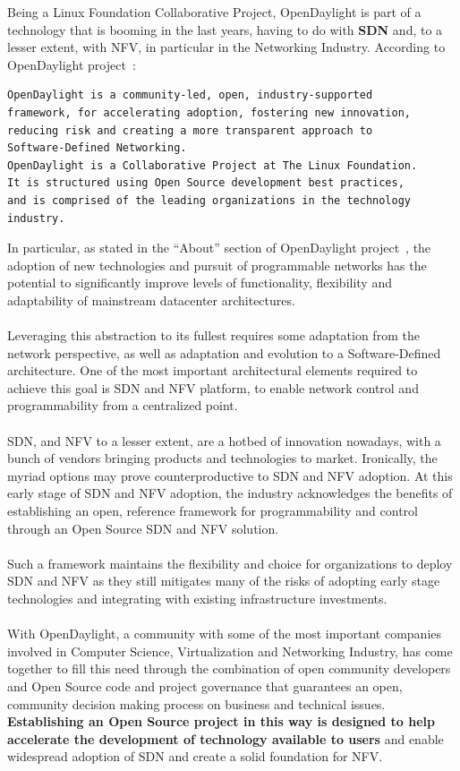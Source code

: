 \documentclass[a4paper, 12pt]{book}
\begin{document}
Being a Linux Foundation Collaborative Project, OpenDaylight is part of a technology that is booming in the last years, having to do with \textbf{SDN} and, to a lesser extent, with NFV, in particular in the Networking Industry. According to OpenDaylight project~\cite{OpenDaylightTheProject}:
\begin{verbatim}
OpenDaylight is a community-led, open, industry-supported
framework, for accelerating adoption, fostering new innovation,
reducing risk and creating a more transparent approach to
Software-Defined Networking.
OpenDaylight is a Collaborative Project at The Linux Foundation.
It is structured using Open Source development best practices,
and is comprised of the leading organizations in the technology
industry.
\end{verbatim}
In particular, as stated in the ``About'' section of OpenDaylight project~\cite{OpenDaylightAbout}, the adoption of new technologies and pursuit of programmable networks has the potential to significantly improve levels of functionality, flexibility and adaptability of mainstream datacenter architectures.\\
\\
Leveraging this abstraction to its fullest requires some adaptation from the network perspective, as well as adaptation and evolution to a Software-Defined architecture. One of the most important architectural elements required to achieve this goal is SDN and NFV platform, to enable network control and programmability from a centralized point.\\
\\
SDN, and NFV to a lesser extent, are a hotbed of innovation nowadays, with a bunch of vendors bringing products and technologies to market. Ironically, the myriad options may prove counterproductive to SDN and NFV adoption. At this early stage of SDN and NFV adoption, the industry acknowledges the benefits of establishing an open, reference framework for programmability and control through an Open Source SDN and NFV solution.\\
\\
Such a framework maintains the flexibility and choice for organizations to deploy SDN and NFV as they still mitigates many of the risks of adopting early stage technologies and integrating with existing infrastructure investments.\\
\\
With OpenDaylight, a community with some of the most important companies involved in Computer Science, Virtualization and Networking Industry, has come together to fill this need through the combination of open community developers and Open Source code and project governance that guarantees an open, community decision making process on business and technical issues. \textbf{Establishing an Open Source project in this way is designed to help accelerate the development of technology available to users} and enable widespread adoption of SDN and create a solid foundation for NFV.\\
\end{document}
